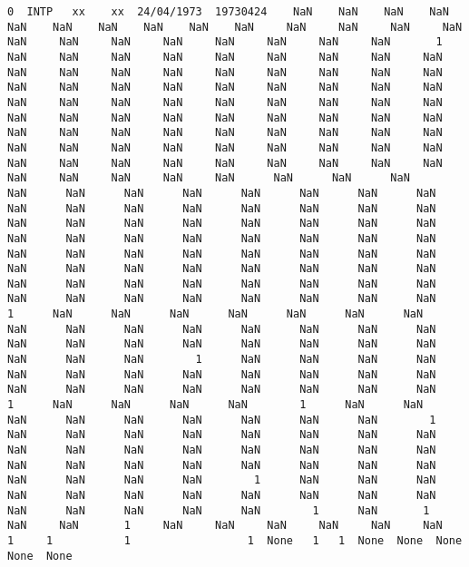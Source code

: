 \documentclass[12pt,fleqn]{article}\usepackage{../common}
\begin{document}
\begin{verbatim}
0  INTP   xx    xx  24/04/1973  19730424    NaN    NaN    NaN    NaN    NaN    NaN    NaN    NaN    NaN    NaN     NaN     NaN     NaN     NaN     NaN     NaN     NaN     NaN     NaN     NaN     NaN     NaN       1     NaN     NaN     NaN     NaN     NaN     NaN     NaN     NaN     NaN     NaN     NaN     NaN     NaN     NaN     NaN     NaN     NaN     NaN     NaN     NaN     NaN     NaN     NaN     NaN     NaN     NaN     NaN     NaN     NaN     NaN     NaN     NaN     NaN     NaN     NaN     NaN     NaN     NaN     NaN     NaN     NaN     NaN     NaN     NaN     NaN     NaN     NaN     NaN     NaN     NaN     NaN     NaN     NaN     NaN     NaN     NaN     NaN     NaN     NaN     NaN     NaN     NaN     NaN     NaN     NaN     NaN     NaN     NaN     NaN     NaN     NaN     NaN     NaN     NaN     NaN     NaN     NaN      NaN      NaN      NaN      NaN      NaN      NaN      NaN      NaN      NaN      NaN      NaN      NaN      NaN      NaN      NaN      NaN      NaN      NaN      NaN      NaN      NaN      NaN      NaN      NaN      NaN      NaN      NaN      NaN      NaN      NaN      NaN      NaN      NaN      NaN      NaN      NaN      NaN      NaN      NaN      NaN      NaN      NaN      NaN      NaN      NaN      NaN      NaN      NaN      NaN      NaN      NaN      NaN      NaN      NaN      NaN      NaN      NaN      NaN      NaN      NaN      NaN      NaN      NaN      NaN      NaN      NaN      NaN        1      NaN      NaN      NaN      NaN      NaN      NaN      NaN      NaN      NaN      NaN      NaN      NaN      NaN      NaN      NaN      NaN      NaN      NaN      NaN      NaN      NaN      NaN      NaN      NaN      NaN      NaN        1      NaN      NaN      NaN      NaN      NaN      NaN      NaN      NaN      NaN      NaN      NaN      NaN      NaN      NaN      NaN      NaN      NaN      NaN      NaN      NaN        1      NaN      NaN      NaN      NaN        1      NaN      NaN      NaN      NaN      NaN      NaN      NaN      NaN      NaN        1      NaN      NaN      NaN      NaN      NaN      NaN      NaN      NaN      NaN      NaN      NaN      NaN      NaN      NaN      NaN      NaN      NaN      NaN      NaN      NaN      NaN      NaN      NaN      NaN      NaN      NaN      NaN      NaN        1      NaN      NaN      NaN      NaN      NaN      NaN      NaN      NaN      NaN      NaN      NaN      NaN      NaN      NaN      NaN      NaN        1      NaN       1     NaN     NaN       1     NaN     NaN     NaN     NaN     NaN     NaN      1     1           1                  1  None   1   1  None  None  None  None  None

\end{verbatim}
\end{document}
